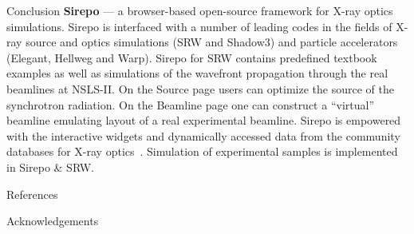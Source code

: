 \documentclass[final]{beamer}
\newlength{\onecolwid}
\begin{document}
\begin{frame}[t]
\begin{columns}[t]
\begin{column}{\onecolwid}
\begin{block}{\faFlag{} Conclusion}
\textbf{Sirepo} --- a browser-based open-source framework for X-ray optics simulations. Sirepo is interfaced with a number of leading codes in the fields of X-ray source and optics simulations (SRW and Shadow3) and particle accelerators (Elegant, Hellweg and Warp). Sirepo for SRW contains predefined textbook examples as well as simulations of the wavefront propagation through the real beamlines at NSLS-II. On the Source page users can optimize the source of the synchrotron radiation. On the Beamline page one can construct a ``virtual'' beamline emulating layout of a real experimental beamline. Sirepo is empowered with the interactive widgets and dynamically accessed data from the community databases for X-ray optics~\cite{stepanov, henke}. Simulation of experimental samples is implemented in Sirepo \& SRW.

\end{block}


\begin{block}{\faBook{} References}

\nocite{*} %
\small{
 \vspace{-0.48cm}}

\end{block}



\begin{block}{\faThumbsOUp{} Acknowledgements}

\small{} \\

\end{block}



\end{column}
\end{columns}
\end{frame}
\end{document}
